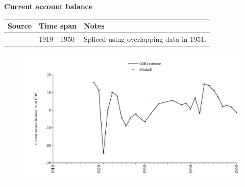\documentclass[12pt,a4paper,landscape]{article}
\begin{document}
\begin{adjustbox}{max totalsize={\paperwidth}{\paperheight},center}
\begin{minipage}[t][\textheight][t]{\textwidth}
\vspace*{0.5cm}
{}
\begin{center}
{\Large\bfseries Current account balance}
\end{center}
\vspace{0.5cm}
\begin{table}[H]
\centering
\small
\begin{tabular}{|l|l|l|}
\hline
\textbf{Source} & \textbf{Time span} & \textbf{Notes} \\
\hline
\rowcolor{white}\cite{Mitchell}& 1919 - 1950 &Spliced using overlapping data in 1951. \\
\hline
\end{tabular}
\end{table}
\begin{figure}[H]
\centering
\includegraphics[width=\textwidth,height=0.6\textheight,keepaspectratio]{graphs/CUB_CA_GDP.pdf}
\end{figure}
\end{minipage}
\end{adjustbox}
\end{document}
